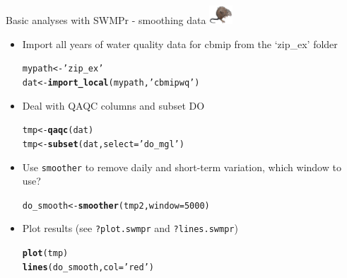 \documentclass[xcolor=dvipsnames,serif]{beamer}\usepackage[]{graphicx}\usepackage[]{color}
\makeatletter
\newcommand{\hlnum}[1]{\textcolor[rgb]{0.686,0.059,0.569}{#1}}%
\newcommand{\hlstr}[1]{\textcolor[rgb]{0.192,0.494,0.8}{#1}}%
\newcommand{\hlstd}[1]{\textcolor[rgb]{0.345,0.345,0.345}{#1}}%
\newcommand{\hlkwb}[1]{\textcolor[rgb]{0.69,0.353,0.396}{#1}}%
\newcommand{\hlkwc}[1]{\textcolor[rgb]{0.333,0.667,0.333}{#1}}%
\newcommand{\hlkwd}[1]{\textcolor[rgb]{0.737,0.353,0.396}{\textbf{#1}}}%
\newenvironment{kframe}{%
 \def\at@end@of@kframe{}%
 \ifinner\ifhmode%
  \def\at@end@of@kframe{\end{minipage}}%
  \begin{minipage}{\columnwidth}%
 \fi\fi%
 \def\FrameCommand##1{\hskip\@totalleftmargin \hskip-\fboxsep
 \colorbox{shadecolor}{##1}\hskip-\fboxsep
     \hskip-\linewidth \hskip-\@totalleftmargin \hskip\columnwidth}%
 \MakeFramed {\advance\hsize-\width
   \@totalleftmargin\z@ \linewidth\hsize
   \@setminipage}}%
 {\par\unskip\endMakeFramed%
 \at@end@of@kframe}
\newenvironment{knitrout}{}{} %
\makeatother
\begin{document}
\begin{frame}[fragile]{Basic analyses with SWMPr - smoothing data \includegraphics[width = 0.065\textwidth]{imgs/swmprat.png}}
\begin{itemize}
\item {}
Import all years of water quality data for cbmip from the `zip\_ex' folder
\begin{knitrout}\scriptsize
{}\color{fgcolor}\begin{kframe}
\begin{alltt}
\hlstd{mypath} \hlkwb{<-} \hlstr{'zip_ex'}
\hlstd{dat} \hlkwb{<-} \hlkwd{import_local}\hlstd{(mypath,} \hlstr{'cbmipwq'}\hlstd{)}
\end{alltt}
\end{kframe}
\end{knitrout}
\vspace{0.1in}
\item {}
Deal with QAQC columns and subset DO
\begin{knitrout}\scriptsize
{}\color{fgcolor}\begin{kframe}
\begin{alltt}
\hlstd{tmp} \hlkwb{<-} \hlkwd{qaqc}\hlstd{(dat)}
\hlstd{tmp} \hlkwb{<-} \hlkwd{subset}\hlstd{(dat,} \hlkwc{select} \hlstd{=} \hlstr{'do_mgl'}\hlstd{)}
\end{alltt}
\end{kframe}
\end{knitrout}
\vspace{0.1in}
\item {}
Use \texttt{smoother} to remove daily and short-term variation, which window to use?
\begin{knitrout}\scriptsize
{}\color{fgcolor}\begin{kframe}
\begin{alltt}
\hlstd{do_smooth} \hlkwb{<-} \hlkwd{smoother}\hlstd{(tmp2,} \hlkwc{window} \hlstd{=} \hlnum{5000}\hlstd{)}
\end{alltt}
\end{kframe}
\end{knitrout}
\vspace{0.1in}
\item {}
Plot results (see \texttt{?plot.swmpr} and \texttt{?lines.swmpr})
\begin{knitrout}\scriptsize
{}\color{fgcolor}\begin{kframe}
\begin{alltt}
\hlkwd{plot}\hlstd{(tmp)}
\hlkwd{lines}\hlstd{(do_smooth,} \hlkwc{col} \hlstd{=} \hlstr{'red'}\hlstd{)}
\end{alltt}
\end{kframe}
\end{knitrout}
\end{itemize}
\end{frame}
\end{document}
